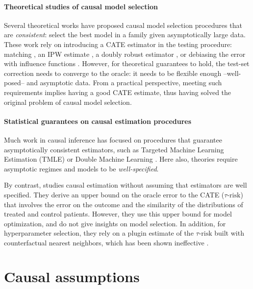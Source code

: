 \documentclass[11pt]{article}
\let\cite=\supercite
\begin{document}
\begin{appendices}
    \paragraph{Theoretical studies of causal model selection}

    Several theoretical works have proposed causal model selection procedures
    that are \emph{consistent}: select the best model in a family given
    asymptotically large data. These work rely on introducing a
    CATE estimator in the testing procedure: matching
    \cite{rolling_model_2014}, an IPW estimate
    \cite{gutierrez_causal_2016}, a doubly robust estimator
    \cite{saito_counterfactual_2020}, or debiasing the error with influence
    functions \cite{alaa_validating_2019}. However, for theoretical
    guarantees to hold, the test-set correction needs to converge to the
    oracle: it needs to be flexible enough --well-posed-- and asymptotic
    data. From a practical perspective, meeting such requirements
    implies having a good CATE estimate, thus having solved
    the original problem of causal model selection.

    \paragraph{Statistical guarantees on causal estimation procedures}

    Much work in causal inference has focused on procedures that
    guarantee asymptotically consistent estimators, such as Targeted
    Machine Learning
    Estimation (TMLE) \cite{laan_targeted_2011,schuler_targeted_2017} or
    Double Machine Learning \cite{chernozhukov_double_2018}. Here also, theories require asymptotic regimes and
    models to be \textit{well-specified}.

    By contrast, \citet{johansson2022generalization} studies causal estimation
    without assuming that estimators are well specified. They derive an upper bound
    on the oracle error to the CATE ($\tau\text{-risk}$) that involves the error on
    the outcome and the similarity of the distributions of treated and control
    patients. However, they use this upper bound for model optimization,
    and do not give insights on model selection. In addition, for hyperparameter
    selection, they rely on a plugin estimate of the $\tau\text{-risk}$ built with
    counterfactual nearest neighbors, which has been shown ineffective
    \cite{schuler_comparison_2018}.


    \section{Causal assumptions}\label{apd:causal_assumptions}


\end{appendices}
\end{document}

